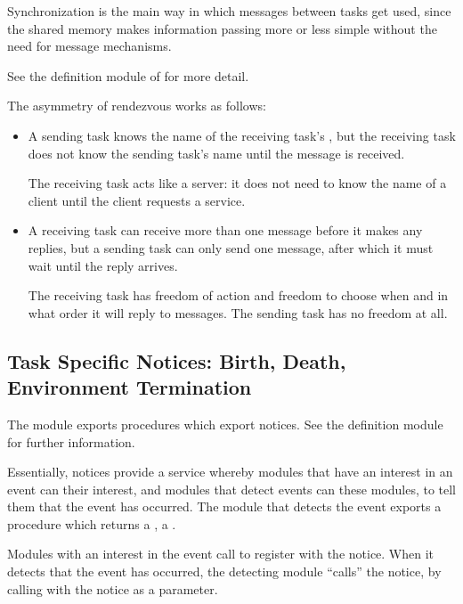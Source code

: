 Synchronization is the main way in which messages between tasks get
used, since the shared memory makes information passing more or less
simple without the need for message mechanisms.

See the definition module of  for more
detail.

The asymmetry of rendezvous works as follows:
\begin{itemize}
\item
 A sending task knows the name of the receiving task's ,
 but the receiving task does not know the sending task's name until the 
message is received.
 
 The receiving task acts like a server:  it does not need to know the
 name of a client until the client requests a service.
\item
 A receiving task can receive more than one message before it makes any
 replies, but a sending task can only send one message, after which it
 must wait until the reply arrives.
 
 The receiving task has freedom of action and freedom to choose when and
 in what order it will reply to messages.  The sending task has no freedom
 at all.
\end{itemize}

\subsection{Task Specific Notices: Birth, Death, Environment Termination}

The module  exports procedures which export notices.  See
the definition module for further information.

Essentially, notices provide a service whereby modules that have an interest
in an event can  their interest, and modules that detect
events can  these modules, to tell them that the event has
occurred.  The module that detects the event exports a procedure which
returns a , a .

Modules with an interest in the event call  to register
with the notice.  When it detects that the event has occurred, the detecting
module ``calls'' the notice, by calling  with the notice
as a parameter.

